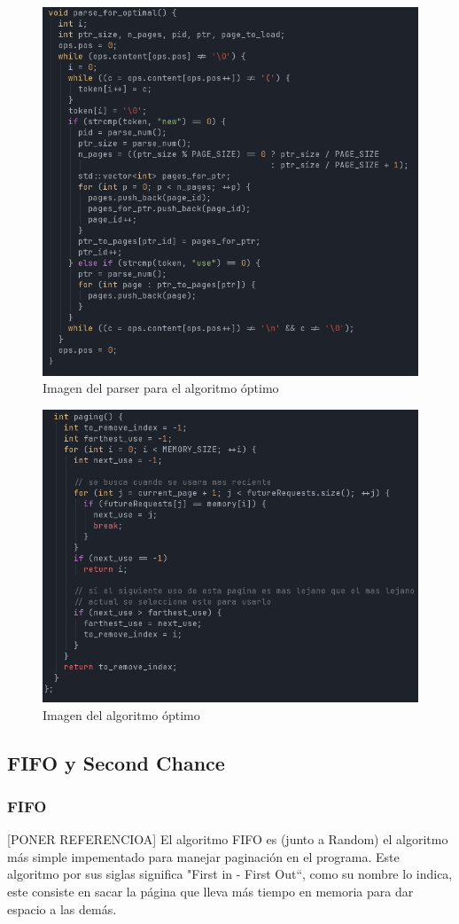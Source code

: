 \documentclass{report}
\begin{document}
\begin{figure}[h]
	\centering
	\includegraphics[width=0.8\linewidth]{figuras/parse_optimal.png}
	\caption{Imagen del parser para el algoritmo óptimo}
	\label{fig:parse_optimal}
\end{figure}

\begin{figure}[h]
	\centering
	\includegraphics[width=0.8\linewidth]{figuras/optimal.png}
	\caption{Imagen del algoritmo óptimo}
	\label{fig:optimal}
\end{figure}


\subsection{FIFO y Second Chance}
\subsubsection{FIFO}
[PONER REFERENCIOA]
El algoritmo FIFO es (junto a Random) el algoritmo más simple impementado para manejar paginación en el programa.
Este algoritmo por sus siglas significa "First in - First Out``, como su nombre lo indica, este consiste en sacar la página que lleva más tiempo en memoria para dar espacio a las demás. \\
\end{document}
